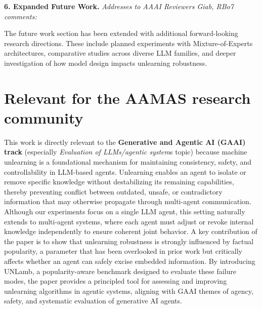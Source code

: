 \documentclass[sigconf,anonymous]{aamas}
\begin{document}
\textbf{6. Expanded Future Work.} \textit{Addresses to AAAI Reviewers Giab, RBo7 comments:}

The future work section has been extended with additional forward-looking research directions. These include planned experiments with Mixture-of-Experts architectures, comparative studies across diverse LLM families, and deeper investigation of how model design impacts unlearning robustness.

\newpage
\section*{Relevant for the AAMAS research community}
This work is directly relevant to the \textbf{Generative and Agentic AI (GAAI) track} (especially \textit{Evaluation of LLMs/agentic system}s topic) because machine unlearning is a foundational mechanism for maintaining consistency, safety, and controllability in LLM-based agents. Unlearning enables an agent to isolate or remove specific knowledge without destabilizing its remaining capabilities, thereby preventing conflict between outdated, unsafe, or contradictory information that may otherwise propagate through multi-agent communication. Although our experiments focus on a single LLM agent, this setting naturally extends to multi-agent systems, where each agent must adjust or revoke internal knowledge independently to ensure coherent joint behavior. A key contribution of the paper is to show that unlearning robustness is strongly influenced by factual popularity, a parameter that has been overlooked in prior work but critically affects whether an agent can safely excise embedded information. By introducing UNLamb, a popularity-aware benchmark designed to evaluate these failure modes, the paper provides a principled tool for assessing and improving unlearning algorithms in agentic systems, aligning with GAAI themes of agency, safety, and systematic evaluation of generative AI agents.
\end{document}
